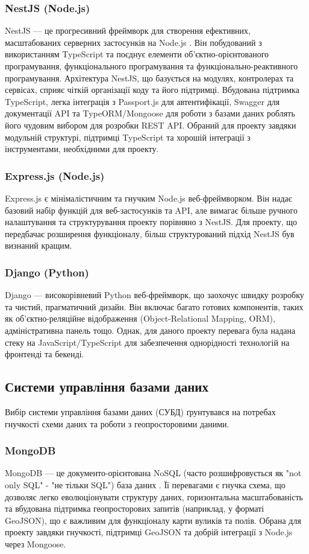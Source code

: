 \subsubsection{NestJS (Node.js)}
NestJS — це прогресивний фреймворк для створення ефективних, масштабованих серверних застосунків на Node.js \cite{nestjs}. Він побудований з використанням TypeScript та поєднує елементи об'єктно-орієнтованого програмування, функціонального програмування та функціонально-реактивного програмування. Архітектура NestJS, що базується на модулях, контролерах та сервісах, сприяє чіткій організації коду та його підтримці. Вбудована підтримка TypeScript, легка інтеграція з Passport.js для автентифікації, Swagger для документації API та TypeORM/Mongoose для роботи з базами даних роблять його чудовим вибором для розробки REST API. Обраний для проекту завдяки модульній структурі, підтримці TypeScript та хорошій інтеграції з інструментами, необхідними для проекту.

\subsubsection{Express.js (Node.js)}
Express.js є мінімалістичним та гнучким Node.js веб-фреймворком. Він надає базовий набір функцій для веб-застосунків та API, але вимагає більше ручного налаштування та структурування проекту порівняно з NestJS. Для проекту, що передбачає розширення функціоналу, більш структурований підхід NestJS був визнаний кращим.

\subsubsection{Django (Python)}
Django — високорівневий Python веб-фреймворк, що заохочує швидку розробку та чистий, прагматичний дизайн. Він включає багато готових компонентів, таких як об'єктно-реляційне відображення (Object-Relational Mapping, ORM), адміністративна панель тощо. Однак, для даного проекту перевага була надана стеку на JavaScript/TypeScript для забезпечення однорідності технологій на фронтенді та бекенді.

\subsection{Системи управління базами даних}
Вибір системи управління базами даних (СУБД) ґрунтувався на потребах гнучкості схеми даних та роботи з геопросторовими даними.
\subsubsection{MongoDB}
MongoDB — це документо-орієнтована NoSQL (часто розшифровується як "not only SQL" - "не тільки SQL") база даних \cite{mongodb}. Її перевагами є гнучка схема, що дозволяє легко еволюціонувати структуру даних, горизонтальна масштабованість та вбудована підтримка геопросторових запитів (наприклад, у форматі GeoJSON), що є важливим для функціоналу карти вуликів та полів. Обрана для проекту завдяки гнучкості, підтримці GeoJSON та добрій інтеграції з Node.js через Mongoose.

